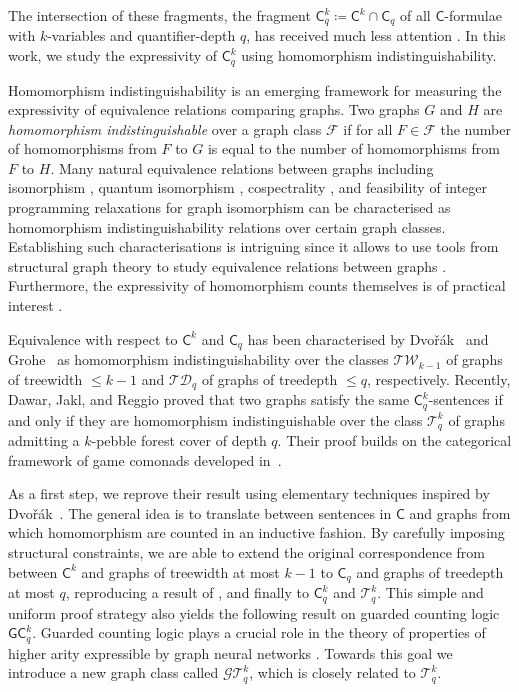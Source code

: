 \documentclass[a4paper,UKenglish,cleveref, autoref, thm-restate]{lipics-v2021}
\newcommand{\Ekq}{\ensuremath{\mathcal{T}_{q}^{k}}}
\newcommand{\GEkqLL}{\ensuremath{\mathcal{G}\Ekq}}
\begin{document}
The intersection of these fragments, the fragment $\mathsf{C}^k_q \coloneqq \mathsf{C}^k \cap \mathsf{C}_q$ of all $\mathsf{C}$-formulae with $k$-variables and quantifier-depth $q$, has received much less attention \cite{rattan_weisfeiler-leman_2023}. In this work, we study the expressivity of $\mathsf{C}^k_q$ using homomorphism indistinguishability.

Homomorphism indistinguishability is an emerging framework for measuring the expressivity of equivalence relations comparing graphs. Two graphs $G$ and $H$ are \emph{homomorphism indistinguishable} over a graph class $\mathcal{F}$ if for all $F \in \mathcal{F}$ the number of homomorphisms from $F$ to $G$ is equal to the number of homomorphisms from $F$ to $H$. Many natural equivalence relations between graphs including isomorphism \cite{lovasz_operations_1967}, quantum isomorphism \cite{mancinska_quantum_2020}, cospectrality \cite{dell_lovasz_2018}, and feasibility of integer programming relaxations for graph isomorphism \cite{grohe_homomorphism_2022,roberson_lasserre_2023} can be characterised as homomorphism indistinguishability relations over certain graph classes. Establishing such characterisations is intriguing since it allows to use tools from structural graph theory to study equivalence relations between graphs \cite{roberson_oddomorphisms_2022,seppelt_logical_2023}.
Furthermore, the expressivity of homomorphism counts themselves is of practical interest \cite{nguyen_graph_2020,grohe_word2vec_2020}.

Equivalence with respect to $\mathsf{C}^{k}$ and $\mathsf{C}_q$ has been characterised by Dvo\v{r}ák~\cite{dvorak_recognizing_2010} and Grohe~\cite{grohe_counting_2020} as homomorphism indistinguishability over the classes $\mathcal{TW}_{k-1}$ of graphs of treewidth $\leq k-1$ and $\mathcal{TD}_q$ of graphs of treedepth $\leq q$, respectively.
Recently, Dawar, Jakl, and Reggio \cite{dawar_lovasz-type_2021} proved that two graphs satisfy the same $\mathsf{C}^k_q$-sentences if and only if they are homomorphism indistinguishable over the class $\Ekq$ of graphs admitting a $k$-pebble forest cover of depth $q$. Their proof builds on the categorical framework of game comonads developed in~\cite{abramsky_pebbling_2017}.


As a first step, we reprove their result using elementary techniques inspired by Dvo\v{r}\'ak~\cite{dvorak_recognizing_2010}. The general idea is to translate between sentences in $\mathsf{C}$ and graphs from which homomorphism are counted in an inductive fashion. By carefully imposing structural constraints, we are able to extend the original correspondence from \cite{dvorak_recognizing_2010} between $\mathsf{C}^{k}$ and graphs of treewidth at most $k-1$ to $\mathsf{C}_q$ and graphs of treedepth at most $q$, reproducing a result of \cite{grohe_counting_2020}, and finally to $\mathsf{C}^k_q$ and $\Ekq$. This simple and uniform proof strategy also yields the following result on guarded counting logic $\mathsf{GC}^k_q$.
Guarded counting logic plays a crucial role in the theory of properties of higher arity expressible by graph neural networks \cite{grohe_logic_2021}.
Towards this goal we introduce a new graph class called \GEkqLL, which is closely related to \Ekq.
\end{document}

